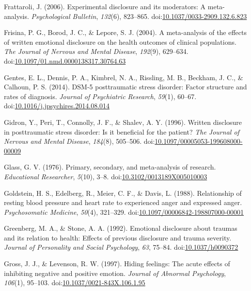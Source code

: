 \documentclass[english,man]{apa6}
\theoremstyle{definition}
\theoremstyle{definition}
\theoremstyle{definition}
\theoremstyle{remark}
\begin{document}
\hypertarget{ref-Frattaroli2006}{}
Frattaroli, J. (2006). Experimental disclosure and its moderators: A
meta-analysis. \emph{Psychological Bulletin}, \emph{132}(6), 823--865.
doi:\href{https://doi.org/10.1037/0033-2909.132.6.823}{10.1037/0033-2909.132.6.823}

\hypertarget{ref-Frisina2004a}{}
Frisina, P. G., Borod, J. C., \& Lepore, S. J. (2004). A meta-analysis
of the effects of written emotional disclosure on the health outcomes of
clinical populations. \emph{The Journal of Nervous and Mental Disease},
\emph{192}(9), 629--634.
doi:\href{https://doi.org/10.1097/01.nmd.0000138317.30764.63}{10.1097/01.nmd.0000138317.30764.63}

\hypertarget{ref-Gentes2014}{}
Gentes, E. L., Dennis, P. A., Kimbrel, N. A., Rissling, M. B., Beckham,
J. C., \& Calhoun, P. S. (2014). DSM-5 posttraumatic stress disorder:
Factor structure and rates of diagnosis. \emph{Journal of Psychiatric
Research}, \emph{59}(1), 60--67.
doi:\href{https://doi.org/10.1016/j.jpsychires.2014.08.014}{10.1016/j.jpsychires.2014.08.014}

\hypertarget{ref-Gidron1996a}{}
Gidron, Y., Peri, T., Connolly, J. F., \& Shalev, A. Y. (1996). Written
disclosure in posttraumatic stress disorder: Is it beneficial for the
patient? \emph{The Journal of Nervous and Mental Disease},
\emph{184}(8), 505--506.
doi:\href{https://doi.org/10.1097/00005053-199608000-00009}{10.1097/00005053-199608000-00009}

\hypertarget{ref-Glass1976}{}
Glass, G. V. (1976). Primary, secondary, and meta-analysis of research.
\emph{Educational Researcher}, \emph{5}(10), 3--8.
doi:\href{https://doi.org/10.3102/0013189X005010003}{10.3102/0013189X005010003}

\hypertarget{ref-Goldstein1988}{}
Goldstein, H. S., Edelberg, R., Meier, C. F., \& Davis, L. (1988).
Relationship of resting blood pressure and heart rate to experienced
anger and expressed anger. \emph{Psychosomatic Medicine}, \emph{50}(4),
321--329.
doi:\href{https://doi.org/10.1097/00006842-198807000-00001}{10.1097/00006842-198807000-00001}

\hypertarget{ref-Greenberg1992}{}
Greenberg, M. A., \& Stone, A. A. (1992). Emotional disclosure about
traumas and its relation to health: Effects of previous disclosure and
trauma severity. \emph{Journal of Personality and Social Psychology},
\emph{63}, 75--84.
doi:\href{https://doi.org/10.1037/h0090372}{10.1037/h0090372}

\hypertarget{ref-Gross1997}{}
Gross, J. J., \& Levenson, R. W. (1997). Hiding feelings: The acute
effects of inhibiting negative and positive emotion. \emph{Journal of
Abnormal Psychology}, \emph{106}(1), 95--103.
doi:\href{https://doi.org/10.1037/0021-843X.106.1.95}{10.1037/0021-843X.106.1.95}
\end{document}
